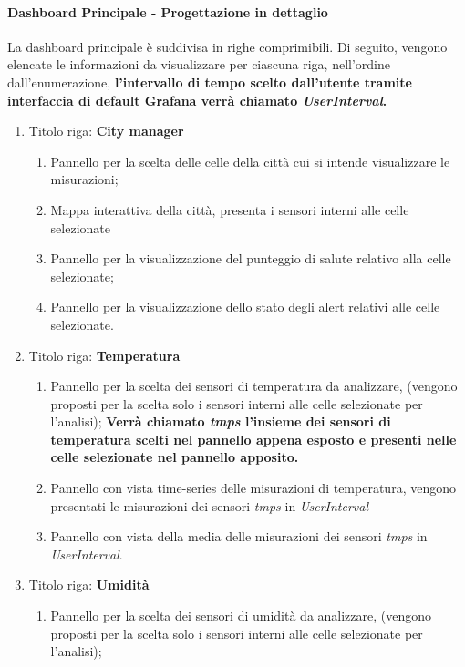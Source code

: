 \paragraph*{Dashboard Principale - Progettazione in dettaglio}
La dashboard principale è suddivisa in righe comprimibili. Di seguito, vengono elencate le informazioni da visualizzare per ciascuna riga, nell’ordine dall'enumerazione, \textbf{ l'intervallo di tempo scelto dall'utente tramite interfaccia di default Grafana verrà chiamato \textit{UserInterval}.}
\begin{enumerate}
    \item Titolo riga: \textbf{City manager}
    \begin{enumerate}
        \item Pannello per la scelta delle celle della città cui si intende visualizzare le misurazioni;
        \item Mappa interattiva della città, presenta i sensori interni alle celle selezionate
        \item Pannello per la visualizzazione del punteggio di salute relativo alla celle selezionate;
        \item Pannello per la visualizzazione dello stato degli alert relativi alle celle selezionate.
    \end{enumerate}
    \item Titolo riga: \textbf{Temperatura}
    \begin{enumerate}
        \item Pannello per la scelta dei sensori di temperatura da analizzare, (vengono proposti per la scelta solo i sensori interni alle celle selezionate per l'analisi);
        \textbf{Verrà chiamato \textit{tmps} l'insieme dei sensori di temperatura scelti nel pannello appena esposto e presenti nelle celle selezionate nel pannello apposito.}
        \item Pannello con vista time-series delle misurazioni di temperatura, vengono presentati le misurazioni dei sensori \textit{tmps} in \textit{UserInterval}
        \item Pannello con vista della media delle misurazioni dei sensori \textit{tmps} in \textit{UserInterval}.
    \end{enumerate}
    \item Titolo riga: \textbf{Umidità}
    \begin{enumerate}
        \item Pannello per la scelta dei sensori di umidità da analizzare, (vengono proposti per la scelta solo i sensori interni alle celle selezionate per l'analisi);

\end{enumerate}
\end{enumerate}
